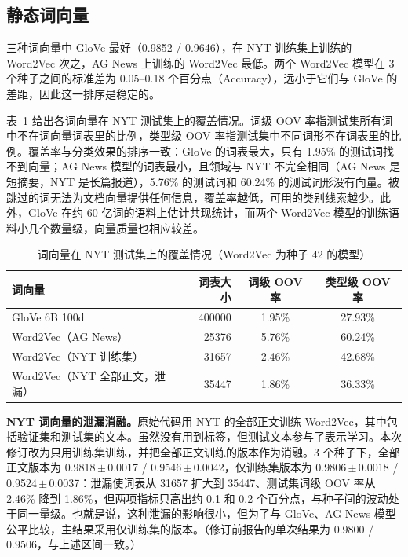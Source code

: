 \documentclass[lang=cn,a4paper]{elegantpaper}
\newcommand{\pmstd}[2]{#1\,$\pm$\,#2}
\begin{document}
\subsection{静态词向量}
\label{sec:emb}

三种词向量中 GloVe 最好（0.9852 / 0.9646），在 NYT 训练集上训练的 Word2Vec 次之，AG News 上训练的 Word2Vec 最低。两个 Word2Vec 模型在 3 个种子之间的标准差为 0.05--0.18 个百分点（Accuracy），远小于它们与 GloVe 的差距，因此这一排序是稳定的。

表~\ref{tab:oov} 给出各词向量在 NYT 测试集上的覆盖情况。词级 OOV 率指测试集所有词中不在词向量词表里的比例，类型级 OOV 率指测试集中不同词形不在词表里的比例。覆盖率与分类效果的排序一致：GloVe 的词表最大，只有 1.95\% 的测试词找不到向量；AG News 模型的词表最小，且领域与 NYT 不完全相同（AG News 是短摘要，NYT 是长篇报道），5.76\% 的测试词和 60.24\% 的测试词形没有向量。被跳过的词无法为文档向量提供任何信息，覆盖率越低，可用的类别线索越少。此外，GloVe 在约 60 亿词的语料上估计共现统计，而两个 Word2Vec 模型的训练语料小几个数量级，向量质量也相应较差。

\begin{table}[htbp]
  \centering
  \caption{词向量在 NYT 测试集上的覆盖情况（Word2Vec 为种子 42 的模型）}
  \label{tab:oov}
  \begin{tabular}{lrcc}
    \toprule
    词向量 & 词表大小 & 词级 OOV 率 & 类型级 OOV 率 \\
    \midrule
    GloVe 6B 100d & 400000 & 1.95\% & 27.93\% \\
    Word2Vec（AG News） & 25376 & 5.76\% & 60.24\% \\
    Word2Vec（NYT 训练集） & 31657 & 2.46\% & 42.68\% \\
    Word2Vec（NYT 全部正文，泄漏） & 35447 & 1.86\% & 36.33\% \\
    \bottomrule
  \end{tabular}
\end{table}

\textbf{NYT 词向量的泄漏消融。}原始代码用 NYT 的全部正文训练 Word2Vec，其中包括验证集和测试集的文本。虽然没有用到标签，但测试文本参与了表示学习。本次修订改为只用训练集训练，并把全部正文训练的版本作为消融。3 个种子下，全部正文版本为 \pmstd{0.9818}{0.0017} / \pmstd{0.9546}{0.0042}，仅训练集版本为 \pmstd{0.9806}{0.0018} / \pmstd{0.9524}{0.0037}：泄漏使词表从 31657 扩大到 35447、测试集词级 OOV 率从 2.46\% 降到 1.86\%，但两项指标只高出约 0.1 和 0.2 个百分点，与种子间的波动处于同一量级。也就是说，这种泄漏的影响很小，但为了与 GloVe、AG News 模型公平比较，主结果采用仅训练集的版本。（修订前报告的单次结果为 0.9800 / 0.9506，与上述区间一致。）
\end{document}
